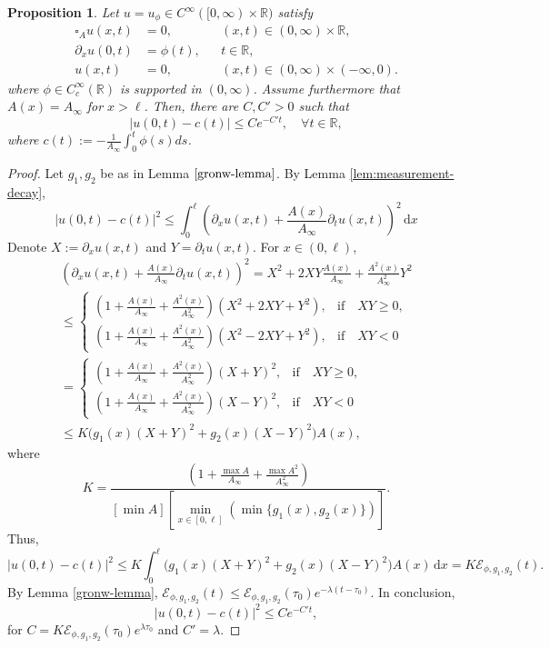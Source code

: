 \documentclass[10pt,a4paper]{article}
\theoremstyle{plain}
\newtheorem{proposition}[theorem]{Proposition}
\theoremstyle{definition}
\theoremstyle{remark}
\numberwithin{equation}{section}
\newcommand{\R}{\mathbb{R}}
\newcommand{\dx}{\,\mathrm{d}x}
\begin{document}
\begin{proposition}\label{1decay-pro}
 Let $u = u_\phi  \in C^\infty( [0,\infty) \times \R)  $ satisfy 
  \begin{align}
    \square_A u(x,t) &= 0, &&   (x,t) \in (0,\infty) \times \R,\\
    \partial_x u (0,t) &= \phi(t), && t\in\R,\\
    u(x,t) &= 0, && (x,t) \in (0,\infty) \times (-\infty,0).
  \end{align}
  where $\phi \in C^{\infty}_c (\R)$ is supported in $(0,\infty)$. Assume furthermore that $A(x)=A_\infty$ for $x > \ell$. Then, there are $C,C'>0$ such that 
 \[
    \big|  u(0,t) -c(t)  \big| \leq C e^{-C't}, \quad \forall t \in \R, 
    \]
    where  $c(t) := - \frac{1}{A_\infty} \int_0^t \phi(s) ds$. 
\end{proposition}
\begin{proof}
Let $g_1,g_2$ be as in Lemma $\ref{gronw-lemma}$. 
By Lemma \ref{lem:measurement-decay},
 \[
 \big|  u(0,t) -c(t)  \big|^2 \leq \int_0^{\ell} \left(   \partial_x u (x,t) + \frac{A(x)}{A_\infty} \partial_t u(x,t) \right)^2  \dx
 \]
 Denote $X :=  \partial_x u (x,t) $ and $Y = \partial_t u(x,t) $. For $x \in (0,\ell)$, 
 \begin{align}
 \left(   \partial_x u (x,t) + \frac{A(x)}{A_\infty} \partial_t u(x,t) \right)^2 =  X^2 +2XY \frac{A(x)}{A_\infty} +   \frac{A^2(x)}{A_\infty^2}Y^2\\
  \leq  \begin{cases}   \left(1+\frac{A(x)}{A_\infty} + \frac{A^2(x)}{A_\infty^2} \right)  (X^2 +2XY +   Y^2) , & \text{if} \quad   XY \geq 0 , \\
 \left(1+\frac{A(x)}{A_\infty} + \frac{A^2(x)}{A_\infty^2} \right)  ( X^2 -2XY +  Y^2), & \text{if} \quad   XY <0  \end{cases} \\
   =   \begin{cases}  \left(1+\frac{A(x)}{A_\infty} + \frac{A^2(x)}{A_\infty^2} \right)   (X + Y)^2 , & \text{if} \quad   XY \geq 0 , \\
  \left(1+\frac{A(x)}{A_\infty} + \frac{A^2(x)}{A_\infty^2} \right)   ( X-Y)^2, & \text{if} \quad   XY <0  \end{cases} \\
 \leq K \Big(  g_1(x)  (X+Y)^2+   g_2(x) (X-Y)^2 \Big) A(x) ,
 \end{align}
 where 
 \[
 K = \frac{ \left(1+\frac{\max A}{A_\infty} + \frac{\max A^2}{A_\infty^2} \right)  }{[ \min  A ] [  \min_{x \in [0,\ell] }  ( \min \{  g_1(x) , g_2(x) \} ) ]}.
 \]
 Thus, 
 \[
  \big|  u(0,t) -c(t)  \big|^2\leq   K \int_0^{\ell}  \Big(  g_1(x)  (X+Y)^2+   g_2(x) (X-Y)^2 \Big) A(x)   \dx = K  \mathscr{E}_{\phi,g_1,g_2}(t). 
 \]
 By Lemma \ref{gronw-lemma}, $\mathscr{E}_{\phi,g_1,g_2}(t) \leq \mathscr{E}_{\phi,g_1,g_2}(\tau_0) e^{-\lambda (t-\tau_0)}$. 
 In conclusion, 
 \[
  \big|  u(0,t) -c(t)  \big|^2\leq  C e^{-C't},
 \]
for $C= K  \mathscr{E}_{\phi,g_1,g_2}(\tau_0)  e^{\lambda \tau_0}$ and $C' = \lambda$. 
\end{proof}
\end{document}
